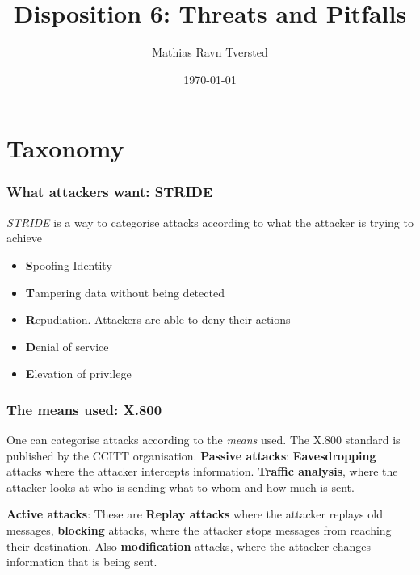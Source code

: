 \documentclass[14pt]{beamer}
\title{Disposition 6: Threats and Pitfalls}
\author{Mathias Ravn Tversted}
\date{\today}
\begin{document}
\frame{\titlepage} 



\section{Taxonomy}
    \begin{frame}
        \frametitle{What attackers want: STRIDE}
            \textit{STRIDE} is a way to categorise attacks according to what the attacker is trying to achieve
            \begin{itemize}
                \item \textbf{S}poofing Identity
                \item \textbf{T}ampering data without being detected
                \item \textbf{R}epudiation. Attackers are able to deny their actions
                \item \textbf{D}enial of service
                \item \textbf{E}levation of privilege
            \end{itemize}
    \end{frame}
    \begin{frame}
        \frametitle{The means used: X.800}
            One can categorise attacks according to the \textit{means} used. The X.800 standard is published by the CCITT organisation.
            \textbf{Passive attacks}: \textbf{Eavesdropping} attacks where the attacker intercepts information. \textbf{Traffic analysis}, where the attacker looks at who is sending what to whom and how much is sent.
            
            \textbf{Active attacks}: These are \textbf{Replay attacks} where the attacker replays old messages, \textbf{blocking} attacks, where the attacker stops messages from reaching their destination. Also \textbf{modification} attacks, where the attacker changes information that is being sent. 
    \end{frame}
\end{document}
